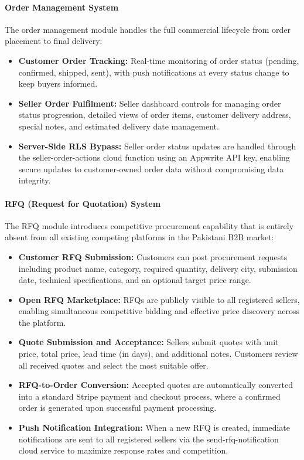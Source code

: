 \paragraph{Order Management System}
The order management module handles the full commercial lifecycle from order placement to final delivery:
\begin{itemize}
    \item \textbf{Customer Order Tracking:} Real-time monitoring of order status (pending, confirmed, shipped, sent), with push notifications at every status change to keep buyers informed.
    \item \textbf{Seller Order Fulfilment:} Seller dashboard controls for managing order status progression, detailed views of order items, customer delivery address, special notes, and estimated delivery date management.
   \item \textbf{Server-Side RLS Bypass:} Seller order status updates are handled through the seller-order-actions cloud function using an Appwrite API key, enabling secure updates to customer-owned order data without compromising data integrity.
\end{itemize}

\paragraph{RFQ (Request for Quotation) System}
The RFQ module introduces competitive procurement capability that is entirely absent from all existing competing platforms in the Pakistani B2B market:
\begin{itemize}
    \item \textbf{Customer RFQ Submission:} Customers can post procurement requests including product name, category, required quantity, delivery city, submission date, technical specifications, and an optional target price range.
    \item \textbf{Open RFQ Marketplace:} RFQs are publicly visible to all registered sellers, enabling simultaneous competitive bidding and effective price discovery across the platform.
    \item \textbf{Quote Submission and Acceptance:} Sellers submit quotes with unit price, total price, lead time (in days), and additional notes. Customers review all received quotes and select the most suitable offer.
    \item \textbf{RFQ-to-Order Conversion:} Accepted quotes are automatically converted into a standard Stripe payment and checkout process, where a confirmed order is generated upon successful payment processing.
    \item \textbf{Push Notification Integration:} When a new RFQ is created, immediate notifications are sent to all registered sellers via the send-rfq-notification cloud service to maximize response rates and competition.
\end{itemize}

